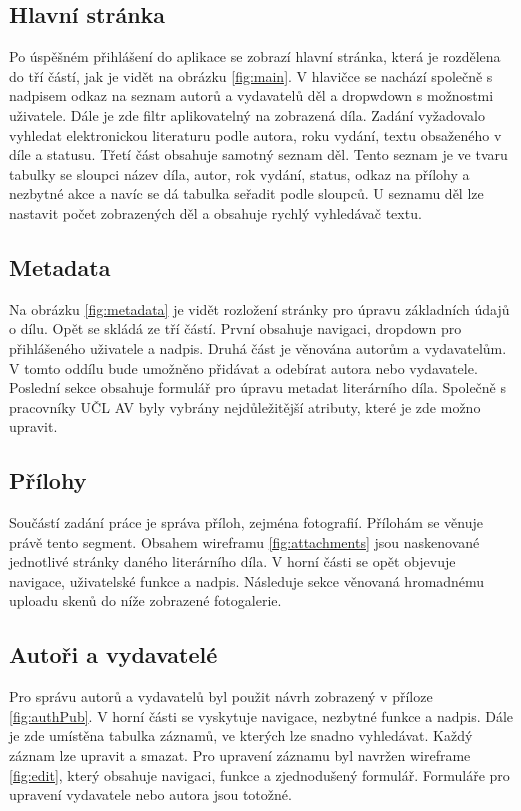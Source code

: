         \subsection{Hlavní stránka}
            Po úspěšném přihlášení do aplikace se zobrazí hlavní stránka, která je rozdělena do tří částí, jak je vidět na obrázku \ref{fig:main}. V hlavičce se nachází společně s nadpisem odkaz na seznam autorů a vydavatelů děl a dropwdown s možnostmi uživatele. Dále je zde filtr aplikovatelný na zobrazená díla. Zadání vyžadovalo vyhledat elektronickou literaturu podle autora, roku vydání, textu obsaženého v díle a statusu. Třetí část obsahuje samotný seznam děl. Tento seznam je ve tvaru tabulky se sloupci název díla, autor, rok vydání, status, odkaz na přílohy a nezbytné akce a navíc se dá tabulka seřadit podle sloupců. U seznamu děl lze nastavit počet zobrazených děl a obsahuje rychlý vyhledávač textu.

        \subsection{Metadata}
            Na obrázku \ref{fig:metadata} je vidět rozložení stránky pro úpravu základních údajů o dílu. Opět se skládá ze tří částí. První obsahuje navigaci, dropdown pro přihlášeného uživatele a nadpis. Druhá část je věnována autorům a vydavatelům. V tomto oddílu bude umožněno přidávat a odebírat autora nebo vydavatele. Poslední sekce obsahuje formulář pro úpravu metadat literárního díla. Společně s pracovníky UČL AV byly vybrány nejdůležitější atributy, které je zde možno upravit. 
        
        \subsection{Přílohy}
            Součástí zadání práce je správa příloh, zejména fotografií. Přílohám se věnuje právě tento segment. Obsahem wireframu \ref{fig:attachments} jsou naskenované jednotlivé stránky daného literárního díla. V horní části se opět objevuje navigace, uživatelské funkce a nadpis. Následuje sekce věnovaná hromadnému uploadu skenů do níže zobrazené fotogalerie.
            
        \subsection{Autoři a vydavatelé}
            Pro správu autorů a vydavatelů byl použit návrh zobrazený v příloze \ref{fig:authPub}. V horní části se vyskytuje navigace, nezbytné funkce a nadpis. Dále je zde umístěna tabulka záznamů, ve kterých lze snadno vyhledávat. Každý záznam lze upravit a smazat. Pro upravení záznamu byl navržen wireframe \ref{fig:edit}, který obsahuje navigaci, funkce a zjednodušený formulář. Formuláře pro upravení vydavatele nebo autora jsou totožné.
            
